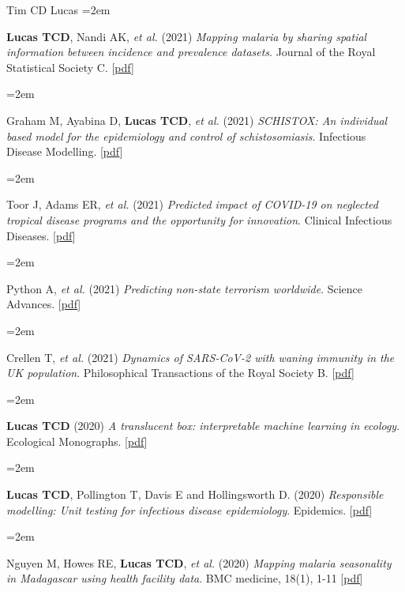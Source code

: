 \documentclass{scrartcl}
\newcommand{\MarginText}[1]{\marginpar{\raggedleft\itshape\small#1}} %
\newcommand{\Description}[1]{\hangindent=2em\hangafter=0\noindent\raggedright\footnotesize{#1}\par\normalsize\vspace{1em}} %
\begin{document}
\begin{cv}{Tim {\Large CD} Lucas}
\Description{\textbf{Lucas TCD}, Nandi AK,  \emph{et al.} (2021) \emph{Mapping malaria by sharing spatial information between incidence and prevalence datasets}. Journal of the Royal Statistical Society C. [\href{https://rss.onlinelibrary.wiley.com/doi/full/10.1111/rssc.12484}{pdf}]}



\Description{Graham M, Ayabina D, \textbf{Lucas TCD}, \emph{et al.} (2021) \emph{SCHISTOX: An individual based model for the epidemiology and control of schistosomiasis}. Infectious Disease Modelling. [\href{https://www.sciencedirect.com/science/article/pii/S2468042721000130}{pdf}]}


\Description{Toor J, Adams ER, \emph{et al.} (2021) \emph{Predicted impact of COVID-19 on neglected tropical disease programs and the opportunity for innovation}. Clinical Infectious Diseases. [\href{https://www.ncbi.nlm.nih.gov/pmc/articles/PMC7543306/}{pdf}]}


\Description{Python A, \emph{et al.} (2021) \emph{Predicting non-state terrorism worldwide}. Science Advances. [\href{https://www.science.org/doi/full/10.1126/sciadv.abg4778}{pdf}]}


\Description{Crellen T, \emph{et al.} (2021) \emph{Dynamics of SARS-CoV-2 with waning immunity in the UK population}. Philosophical Transactions of the Royal Society B. [\href{https://royalsocietypublishing.org/doi/full/10.1098/rstb.2020.0274}{pdf}]}






\Description{\MarginText{2020}\textbf{Lucas TCD} (2020) \emph{A translucent box: interpretable machine learning in ecology}. Ecological Monographs. [\href{https://esajournals.onlinelibrary.wiley.com/doi/epdf/10.1002/ecm.1422}{pdf}]}




\Description{\textbf{Lucas TCD}, Pollington T, Davis E and Hollingsworth D. (2020) \emph{Responsible modelling: Unit testing for infectious disease epidemiology}. Epidemics. [\href{https://www.sciencedirect.com/science/article/pii/S1755436520300451}{pdf}]}



\Description{Nguyen M, Howes RE, \textbf{Lucas TCD},  \emph{et al.} (2020) \emph{Mapping malaria seasonality in Madagascar using health facility data}. BMC medicine, 18(1), 1-11 [\href{https://bmcmedicine.biomedcentral.com/track/pdf/10.1186/s12916-019-1486-3}{pdf}]}



\end{cv}
\end{document}
